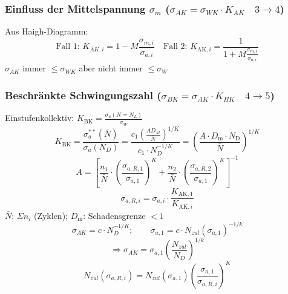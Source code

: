 	    \subsubsection{Einfluss der Mittelspannung $\sigma_m$ ($\sigma_{AK} = \sigma_{WK}\cdot K_{AK}\quad3\rightarrow4$)}
            Aus Haigh-Diagramm:
            \[\textrm{Fall 1: }\boxed{K_{AK,i}=1-M\frac{\sigma_{m,i}}{\sigma_{a,i}}}\quad\textrm{Fall 2: }\boxed{K_{\textrm{AK},i}=\frac{1}{1+M\frac{\sigma_{m,i}}{\sigma_{a,i}}}}\]
            $\sigma_{AK}$ immer $\leq\sigma_{WK}$ aber nicht immer $\leq\sigma_W$
	    \subsubsection{Beschränkte Schwingungszahl ($\sigma_{BK} = \sigma_{AK}\cdot K_{BK}\quad4\rightarrow5$)}
            Einstufenkollektiv: $\displaystyle K_{\textrm{BK}}= \frac{\sigma_{a}(N=N_L)}{\sigma_W}$\\
            \[\boxed{ K_{\textrm{BK}}=\frac{\sigma_{a}^{**}(\bar{N})}{\sigma_{a}(N_{D})}=\frac{c_1\left(\frac{AD_M}{\bar{N}}\right)^{1/K}}{c_1\cdot N_D^{-1/K}}=\left(\frac{A\cdot D_{\textrm{m}}\cdot N_{\textrm{D}}}{\bar{N}}\right)^{1/K}}\]
            \[\boxed{A = \left[\frac{n_1}{\bar{N}}\cdot\left(\frac{\sigma_{a,R,1}}{\sigma_{a,1}}\right)^{K}+\frac{n_2}{\bar{N}}\cdot\left(\frac{\sigma_{a,R,2}}{\sigma_{a,1}}\right)^{K}\right]^{-1}}\]
            \[ \sigma_{a,R,i}=\sigma_{a,i}\cdot\frac{K_{\textrm{AK},1}}{K_{\textrm{AK},i}}\]
	    $\bar{N}$: $\Sigma n_i$ (Zyklen); \qquad $D_{\textrm{m}}$: Schadensgrenze $<1$
            \[\sigma_{AK}=c\cdot N_D^{-1/K}; \qquad \sigma_{a,1}= c\cdot N_{zul}(\sigma_{a,1})^{-1/k}\]
            \[\Rightarrow \sigma_{AK}= \sigma_{a,1}\left(\frac{N_{zul}}{N_D}\right)^{1/k}\]
            \[N_{zul}(\sigma_{a,R,i})=N_{zul}(\sigma_{a,1})\left(\frac{\sigma_{a,1}}{\sigma_{a,R,i}}\right)^K\]

\vfill\null\columnbreak
